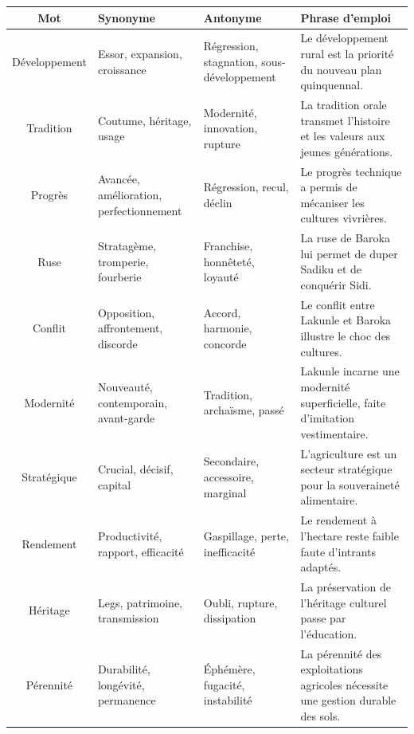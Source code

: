 \documentclass[11pt]{article}
\newcommand{\cle}[1]{{\popxbold\color{popdark}#1}}
\begin{document}
\begin{corrige}
\begin{center}
\begin{tabularx}{\linewidth}{|c|X|X|X|}\hline
\textbf{Mot} & \textbf{Synonyme} & \textbf{Antonyme} & \textbf{Phrase d'emploi} \\ \hline
Développement & Essor, expansion, croissance & Régression, stagnation, sous-développement & Le \cle{développement} rural est la priorité du nouveau plan quinquennal. \\ \hline
Tradition & Coutume, héritage, usage & Modernité, innovation, rupture & La \cle{tradition} orale transmet l'histoire et les valeurs aux jeunes générations. \\ \hline
Progrès & Avancée, amélioration, perfectionnement & Régression, recul, déclin & Le \cle{progrès} technique a permis de mécaniser les cultures vivrières. \\ \hline
Ruse & Stratagème, tromperie, fourberie & Franchise, honnêteté, loyauté & La \cle{ruse} de Baroka lui permet de duper Sadiku et de conquérir Sidi. \\ \hline
Conflit & Opposition, affrontement, discorde & Accord, harmonie, concorde & Le \cle{conflit} entre Lakunle et Baroka illustre le choc des cultures. \\ \hline
Modernité & Nouveauté, contemporain, avant-garde & Tradition, archaïsme, passé & Lakunle incarne une \cle{modernité} superficielle, faite d'imitation vestimentaire. \\ \hline
Stratégique & Crucial, décisif, capital & Secondaire, accessoire, marginal & L'agriculture est un secteur \cle{stratégique} pour la souveraineté alimentaire. \\ \hline
Rendement & Productivité, rapport, efficacité & Gaspillage, perte, inefficacité & Le \cle{rendement} à l'hectare reste faible faute d'intrants adaptés. \\ \hline
Héritage & Legs, patrimoine, transmission & Oubli, rupture, dissipation & La préservation de l'\cle{héritage} culturel passe par l'éducation. \\ \hline
Pérennité & Durabilité, longévité, permanence & Éphémère, fugacité, instabilité & La \cle{pérennité} des exploitations agricoles nécessite une gestion durable des sols. \\ \hline
\end{tabularx}
\end{center}
\end{corrige}
\end{document}
